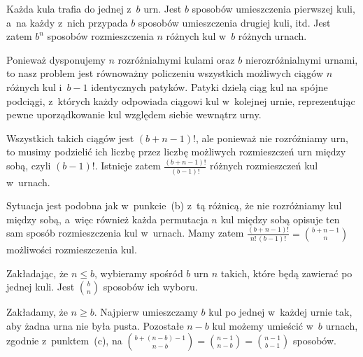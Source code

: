 \subproblem %
Każda kula trafia do jednej z~$b$ urn. Jest $b$ sposobów umieszczenia pierwszej kuli, a~na każdy z~nich przypada $b$ sposobów umieszczenia drugiej kuli, itd. Jest zatem $b^n$ sposobów rozmieszczenia $n$ różnych kul w~$b$ różnych urnach.

\subproblem %
Ponieważ dysponujemy $n$ rozróżnialnymi kulami oraz $b$ nierozróżnialnymi urnami, to nasz problem jest równoważny policzeniu wszystkich możliwych ciągów $n$ różnych kul i~$b-1$ identycznych patyków. Patyki dzielą ciąg kul na spójne podciągi, z~których każdy odpowiada ciągowi kul w~kolejnej urnie, reprezentując pewne uporządkowanie kul względem siebie wewnątrz urny.

Wszystkich takich ciągów jest $(b+n-1)!$, ale ponieważ nie rozróżniamy urn, to musimy podzielić ich liczbę przez liczbę możliwych rozmieszczeń urn między sobą, czyli $(b-1)!$. Istnieje zatem $\frac{(b+n-1)!}{(b-1)!}$ różnych rozmieszczeń kul w~urnach.

\subproblem %
Sytuacja jest podobna jak w~punkcie~(b) z~tą różnicą, że nie rozróżniamy kul między sobą, a~więc również każda permutacja $n$ kul między sobą opisuje ten sam sposób rozmieszczenia kul w~urnach. Mamy zatem $\frac{(b+n-1)!}{n!\,(b-1)!}=\binom{b+n-1}{n}$ możliwości rozmieszczenia kul.

\subproblem %
Zakładając, że $n\le b$, wybieramy spośród $b$ urn $n$ takich, które będą zawierać po jednej kuli. Jest $\binom{b}{n}$ sposobów ich wyboru.

\subproblem %
Zakładamy, że $n\ge b$. Najpierw umieszczamy $b$ kul po jednej w~każdej urnie tak, aby żadna urna nie była pusta. Pozostałe $n-b$ kul możemy umieścić w~$b$ urnach, zgodnie z~punktem~(c), na $\binom{b+(n-b)-1}{n-b}=\binom{n-1}{n-b}=\binom{n-1}{b-1}$ sposobów.

\endinput
